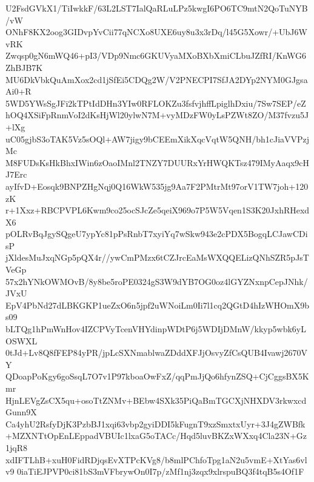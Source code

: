 U2FsdGVkX1/TiIwkkF/63L2LST7IalQaRLuLPz5kwgI6PO6TC9mtN2QoTuNYB/vW
ONhF8KX2oog3GIDvpYvCii77qNCXo8UXE6uy8u3x3rDq/l45G5Xowr/+UbJ6WvRK
Zwqsp0gN6mWQ46+pI3/VDp9Nmc6GKUVyaMXoBXbXmiCLbuJZfRI/KnWG6ZhBJB7K
MU6DkVbkQuAmXox2cd1jSfEi5CDQg2W/V2PNECPI7SfJA2DYp2NYM0GJgsaAi0+R
5WD5YWsSgJFi2kTPtIdDHn3YIw0RFLOKZu3fsfvjhffLpiglhDxiu/7Sw7SEP/eZ
hOQ4XSiFpRnmVoI2dKsHjWl20ylwN7M+vyMDzFW0yLsPZWt8ZO/M37fvzu5J+lXg
uC05gjbS3oTAK5Vz5sOQl+AW7jigy9bCEEmXikXqcVqtW5QNH/bh1cJiaVVPzjMc
M8FUDsKsHkBhxIWin6zOaoIMnl2TNZY7DUURxYrHWQKTsz479IMyAaqx9cHJ7Erc
ayIfvD+Eosqk9BNPZHgNqj0Q16WkW535jg9Aa7F2PMtrMt97orV1TW7joh+120zK
r+1Xxz+RBCPVPL6Kwm9co25ocSJcZe5qeiX969o7P5W5Vqen1S3K20JxhRHexdX6
pOLRvBqJgySQgeU7ypYc81pPsRnbT7xyiYq7wSkw943e2cPDX5BogqLCJawCDisP
jXldesMuJxqNGp5pQX4r//ywCmPMzx6tCZJrcEaMsWXQQELizQNhSZR5pJsTVeGp
57x2hYNkOWMOvB/8y8be5roPE0324gS3W9dYB7OG0oz4lGYZNxnpCepJNhk/JVxU
EpV4PbNd27dLBKGKP1ueZxO6n5jpf2uWNoiLm0Ii7l1cq2QGtD4hIzWHOmX9bs09
bLTQg1hPmWnHov4IZCPVyTcenVHYdinpWDtP6j5WDIjDMnW/kkyp5wbk6yLOSWXL
0tJd+Lv8Q8fFEP84yPR/jpLcSXNmablwaZDddXFJjOsvyZfCsQUB4Ivawj2670VY
QDoapPoKgy6goSsqL7O7v1P97kboaOwFxZ/qqPmJjQo6hfynZSQ+CjCggsBX5Kmr
HjnLEVgZsCX5qu+osoTtZNMv+BEbw4SXk35PiQaBmTGCXjNHXDV3rkwxcdGunn9X
Ca4yhU2RsfyDjK3PzbBJ1xqi63vbp2gyiDDI5kFugnT9xzSmxtxUyr+3J4gZWBfk
+MZXNTtOpEnLEppadVBUIc1lxaG5oTACc/Hqd5luvBKZxWXxq4Cla23N+Gz1jqR8
xdIFTLhB+xuH0FidRDjqsEvXTPcKVg8/b8mlPChfoTpg1aN2u5vmE+XtYas6vlv9
0iaTiEJPVP0ci81bS3mVFbrywOn0I7p/zMf1nj3zqx9xlrspuBQ3f4tqB5s4Of1F
